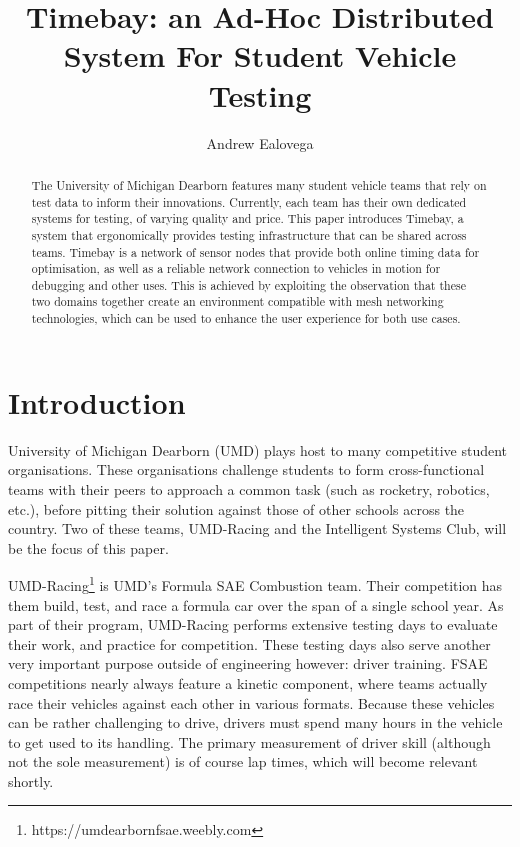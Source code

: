 \documentclass[journal]{IEEEtran}
\begin{document}
%
\title{Timebay: an Ad-Hoc Distributed System For Student Vehicle Testing}

\author{Andrew Ealovega}

\maketitle

\begin{abstract}
The University of Michigan Dearborn features many student vehicle teams that rely on test data to inform their innovations. Currently, each team has their own dedicated systems for testing, of varying quality and price. This paper introduces Timebay, a system that ergonomically provides testing infrastructure that can be shared across teams. Timebay is a network of sensor nodes that provide both online timing data for optimisation, as well as a reliable network connection to vehicles in motion for debugging and other uses. This is achieved by exploiting the observation that these two domains together create an environment compatible with mesh networking technologies, which can be used to enhance the user experience for both use cases. 
\end{abstract}

\section{Introduction}

 University of Michigan Dearborn (UMD) plays host to many competitive student organisations.
These organisations challenge students to form cross-functional teams with their peers to approach a common task (such as rocketry, robotics, etc.), before
pitting their solution against those of other schools across the country. Two of these teams, UMD-Racing and the Intelligent Systems Club, will be the focus of this paper.
    
UMD-Racing\footnote{https://umdearbornfsae.weebly.com} is UMD's Formula SAE Combustion team. Their competition has them build, test, and race a formula car over the span of a single school year. As part of their program, UMD-Racing performs extensive testing days to evaluate their work, and practice for competition. These testing days also serve another very important purpose outside of engineering however: driver training. FSAE competitions nearly always feature a kinetic component, where teams actually race their vehicles against each other in various formats. Because these vehicles can be rather challenging to drive, drivers must spend many hours in the vehicle to get used to its handling. The primary measurement of driver skill (although not the sole measurement) is of course lap times, which will become relevant shortly.
\end{document}
